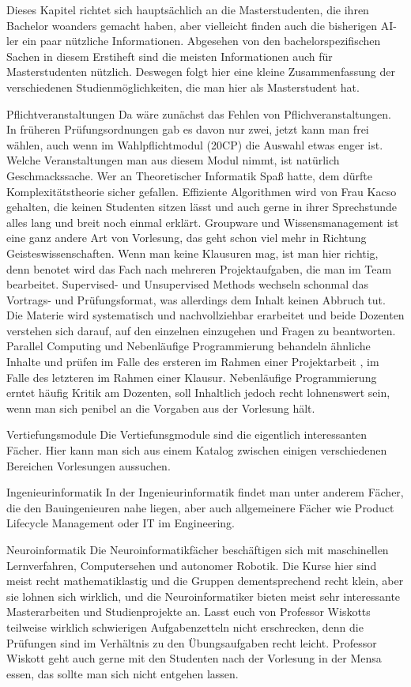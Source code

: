 Dieses Kapitel richtet sich hauptsächlich an die Masterstudenten, die ihren Bachelor woanders gemacht haben, aber vielleicht finden auch die bisherigen AI-ler ein paar nützliche Informationen. Abgesehen von den bachelorspezifischen Sachen in diesem Erstiheft sind die meisten Informationen auch für Masterstudenten nützlich. Deswegen folgt hier eine kleine Zusammenfassung der verschiedenen Studienmöglichkeiten, die man hier als Masterstudent hat.

Pflichtveranstaltungen
Da wäre zunächst das Fehlen von Pflichveranstaltungen. In früheren Prüfungsordnungen gab es davon nur zwei, jetzt kann man frei wählen, auch wenn im Wahlpflichtmodul (20CP) die Auswahl etwas enger ist. Welche Veranstaltungen man aus diesem Modul nimmt, ist natürlich Geschmackssache. Wer an Theoretischer Informatik Spaß hatte, dem dürfte Komplexitätstheorie sicher gefallen. Effiziente Algorithmen wird von Frau Kacso gehalten, die keinen Studenten sitzen lässt und auch gerne in ihrer Sprechstunde alles lang und breit noch einmal erklärt.
Groupware und Wissensmanagement ist eine ganz andere Art von Vorlesung, das geht schon viel mehr in Richtung Geisteswissenschaften. Wenn man keine Klausuren mag, ist man hier richtig, denn benotet wird das Fach nach mehreren Projektaufgaben, die man im Team bearbeitet.
Supervised- und Unsupervised Methods wechseln schonmal das Vortrags- und Prüfungsformat,  was allerdings dem Inhalt keinen Abbruch tut. Die Materie wird systematisch und nachvollziehbar erarbeitet und beide Dozenten verstehen sich darauf, auf den einzelnen einzugehen und Fragen zu beantworten.
Parallel Computing und Nebenläufige Programmierung behandeln ähnliche Inhalte und prüfen im Falle des ersteren im Rahmen einer Projektarbeit , im Falle des letzteren im Rahmen einer Klausur. Nebenläufige Programmierung erntet häufig Kritik am Dozenten, soll Inhaltlich jedoch recht lohnenswert sein, wenn man sich penibel an die Vorgaben aus der Vorlesung hält. 



Vertiefungsmodule
Die Vertiefunsgmodule sind die eigentlich interessanten Fächer. Hier kann man sich aus einem Katalog zwischen einigen verschiedenen Bereichen Vorlesungen aussuchen.

Ingenieurinformatik
In der Ingenieurinformatik findet man unter anderem Fächer, die den Bauingenieuren nahe liegen, aber auch allgemeinere Fächer wie Product Lifecycle Management oder IT im Engineering.

Neuroinformatik
Die Neuroinformatikfächer beschäftigen sich mit maschinellen Lernverfahren, Computersehen und autonomer Robotik. Die Kurse hier sind meist recht mathematiklastig und die Gruppen dementsprechend recht klein, aber sie lohnen sich wirklich, und die Neuroinformatiker bieten meist sehr interessante Masterarbeiten und Studienprojekte an. Lasst euch von Professor Wiskotts teilweise wirklich schwierigen Aufgabenzetteln nicht erschrecken, denn die Prüfungen sind im Verhältnis zu den Übungsaufgaben recht leicht. Professor Wiskott geht auch gerne mit den Studenten nach der Vorlesung in der Mensa essen, das sollte man sich nicht entgehen lassen.

